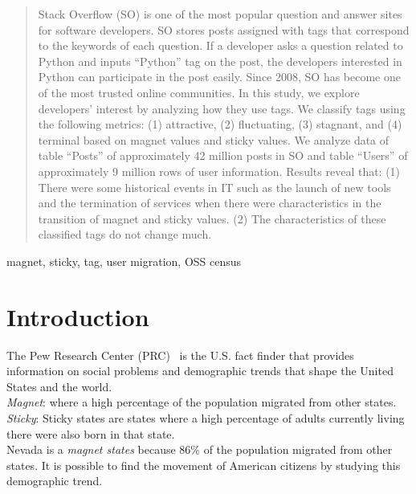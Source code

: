 \documentclass[conference]{IEEEtran}
\begin{document}
\maketitle

\begin{abstract}
Stack Overflow (SO) is one of the most popular question and answer sites for software developers. SO stores posts assigned with tags that correspond to the keywords of each question. If a developer asks a question related to Python and inputs ``Python'' tag on the post, the developers interested in Python can participate in the post easily. Since 2008, SO has become one of the most trusted online communities. In this study, we explore developers' interest by analyzing how they use tags. We classify tags using the following metrics: (1) attractive, (2) fluctuating, (3) stagnant, and (4) terminal based on magnet values and sticky values. We analyze data of table ``Posts'' of approximately 42 million posts in SO and table ``Users'' of approximately 9 million rows of user information. Results reveal that: (1) There were some historical events in IT such as the launch of new tools and the termination of services when there were characteristics in the transition of magnet and sticky values. (2) The characteristics of these classified tags do not change much.
\end{abstract}

\begin{IEEEkeywords}
magnet, sticky, tag, user migration, OSS census
\end{IEEEkeywords}

\section{Introduction}
The Pew Research Center (PRC)~\cite{communityeconomic} is the U.S. fact finder that provides information on social problems and demographic trends that shape the United States and the world. \\
\emph{Magnet}: where a high percentage of the population migrated from other states.\\
\emph{Sticky}: Sticky states are states where a high percentage of adults currently living there were also born in that state.\\
Nevada is a \emph{magnet states} because  86\% of the population migrated from other states. It is possible to find the movement of American citizens by studying this demographic trend.
\end{document}
